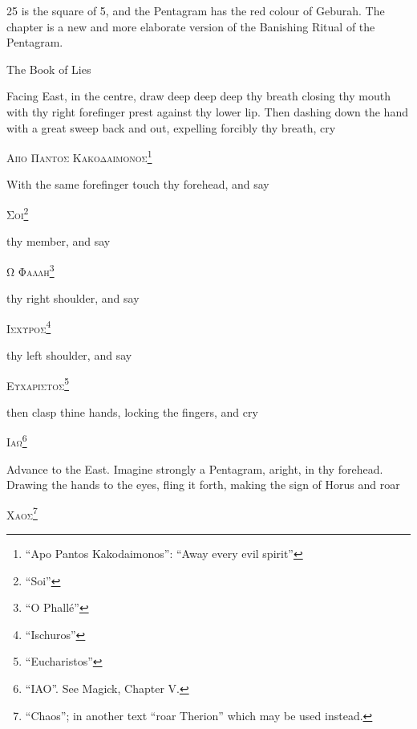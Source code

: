 
\epigraph{25 is the square of 5, and the Pentagram has the red colour of Geburah. The chapter is a new and more elaborate version of the Banishing Ritual of the Pentagram.}{The Book of Lies}


Facing East, in the centre, draw deep deep deep thy breath closing thy mouth with thy right forefinger prest against thy lower lip. Then dashing down the hand with a great sweep back and out, expelling forcibly thy breath, cry


\begin{quoting}[indentfirst=false]
\textgreek{\textsc{Απο Παντος Κακοδαιμονος}}\footnote{\enquote{Apo Pantos Kakodaimonos}: \enquote{Away every evil spirit}}
\end{quoting}

With the same forefinger touch thy forehead, and say
\begin{quoting}[indentfirst=false]
\textgreek{\textsc{Σοι}}\footnote{\enquote{Soi}}
\end{quoting}

thy member, and say
\begin{quoting}[indentfirst=false]
\textgreek{\textsc{Ω Φαλλη}}\footnote{\enquote{O Phall\'e}}
\end{quoting}

thy right shoulder, and say
\begin{quoting}[indentfirst=false]
\textgreek{\textsc{Ισχυροσ}}\footnote{\enquote{Ischuros}}
\end{quoting}

thy left shoulder, and say
\begin{quoting}[indentfirst=false]
\textgreek{\textsc{Ευχαριστοσ}}\footnote{\enquote{Eucharistos}}
\end{quoting}

then clasp thine hands, locking the fingers, and cry
\begin{quoting}[indentfirst=false]
\textgreek{\textsc{Ιαω}}\footnote{\enquote{IAO}. See Magick, Chapter V.}
\end{quoting}

Advance to the East. Imagine strongly a Pentagram, aright, in thy forehead. Drawing the hands to the eyes, fling it forth, making the sign of Horus and roar
\begin{quoting}[indentfirst=false]
\textgreek{\textsc{Χαοσ}}\footnote{\enquote{Chaos}; in another text \enquote{roar Therion} which may be used instead.}
\end{quoting}

